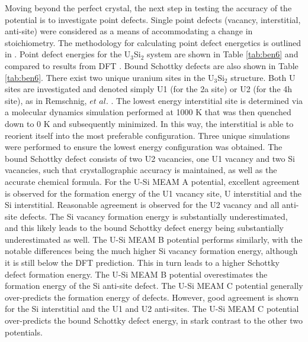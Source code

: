 \documentclass[review]{elsarticle}
\begin{document}
\FloatBarrier

Moving beyond the perfect crystal, the next step in testing the accuracy of the potential is to investigate point defects.  Single point defects (vacancy, interstitial, anti-site) were considered as a means of accommodating a change in stoichiometry.  The methodology for calculating point defect energetics is outlined in \cite{middleburgh2016}.  Point defect energies for the U$_{3}$Si$_{2}$ system are shown in Table \ref{tab:ben6} and compared to results from DFT \cite{middleburgh2016}.  Bound Schottky defects are also shown in Table \ref{tab:ben6}.  There exist two unique uranium sites in the U$_{3}$Si$_{2}$ structure.  Both U sites are investigated and denoted simply U1 (for the 2a site) or U2 (for the 4h site), as in Remschnig, $\textit{et al.}$ \cite{remschnig1992}.  The lowest energy interstitial site is determined via a molecular dynamics simulation performed at 1000 K that was then quenched down to 0 K and subsequently minimized.   In this way, the interstitial is able to reorient itself into the most preferable configuration.  Three unique simulations were performed to ensure the lowest energy configuration was obtained.  The bound Schottky defect consists of two U2 vacancies, one U1 vacancy and two Si vacancies, such that crystallographic accuracy is maintained, as well as the accurate chemical formula.  For the U-Si MEAM A potential, excellent agreement is observed for the formation energy of the U1 vacancy site, U interstitial and the Si interstitial.  Reasonable agreement is observed for the U2 vacancy and all anti-site defects.  The Si vacancy formation energy is substantially underestimated, and this likely leads to the bound Schottky defect energy being substantially underestimated as well.       The U-Si MEAM B potential performs similarly, with the notable differences being the much higher Si vacancy formation energy, although it is still below the DFT prediction.  This in turn leads to a higher Schottky defect formation energy.  The U-Si MEAM B potential overestimates the formation energy of the Si anti-site defect.  The U-Si MEAM C potential generally over-predicts the formation energy of defects.  However, good agreement is shown for the Si interstitial and the U1 and U2 anti-sites.  The U-Si MEAM C potential over-predicts the bound Schottky defect energy, in stark contrast to the other two potentials.  
\end{document}
